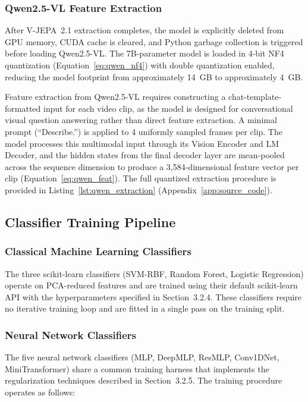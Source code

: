 \subsubsection{Qwen2.5-VL Feature Extraction}

After V-JEPA~2.1 extraction completes, the model is explicitly deleted from GPU memory, CUDA cache is cleared, and Python garbage collection is triggered before loading Qwen2.5-VL. The 7B-parameter model is loaded in 4-bit NF4 quantization (Equation~\ref{eq:qwen_nf4}) with double quantization enabled, reducing the model footprint from approximately 14~GB to approximately 4~GB.

Feature extraction from Qwen2.5-VL requires constructing a chat-template-formatted input for each video clip, as the model is designed for conversational visual question answering rather than direct feature extraction. A minimal prompt (``Describe.'') is applied to 4 uniformly sampled frames per clip. The model processes this multimodal input through its Vision Encoder and LM Decoder, and the hidden states from the final decoder layer are mean-pooled across the sequence dimension to produce a 3,584-dimensional feature vector per clip (Equation~\ref{eq:qwen_feat}). The full quantized extraction procedure is provided in Listing~\ref{lst:qwen_extraction} (Appendix~\ref{app:source_code}).

\subsection{Classifier Training Pipeline}

\subsubsection{Classical Machine Learning Classifiers}

The three scikit-learn classifiers (SVM-RBF, Random Forest, Logistic Regression) operate on PCA-reduced features and are trained using their default scikit-learn API with the hyperparameters specified in Section~3.2.4. These classifiers require no iterative training loop and are fitted in a single pass on the training split.

\subsubsection{Neural Network Classifiers}

The five neural network classifiers (MLP, DeepMLP, ResMLP, Conv1DNet, MiniTransformer) share a common training harness that implements the regularization techniques described in Section~3.2.5. The training procedure operates as follows:

